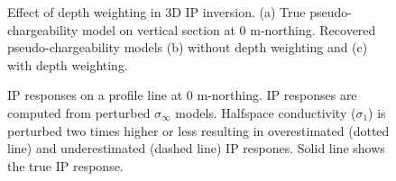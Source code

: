 \documentclass[extra,mreferee]{gji}
\newcommand{\siginf}{\sigma_\infty}
\begin{document}
\begin{figure}
  \caption{Effect of depth weighting in 3D IP inversion. (a) True pseudo-chargeability model on vertical section at 0 m-northing. Recovered pseudo-chargeability models (b) without depth weighting and (c) with depth weighting.}
  \label{F:Depthweight}
\end{figure}

\begin{figure}
  \caption{IP responses on a profile line at 0 m-northing.  IP responses are computed from perturbed $\siginf$ models. Halfspace conductivity ($\sigma_1$) is perturbed two times higher or less resulting in overestimated (dotted line) and underestimated (dashed line) IP respones. Solid line shows the true IP response. }
  \label{F:Reg_IPresp}
\end{figure}
\end{document}

